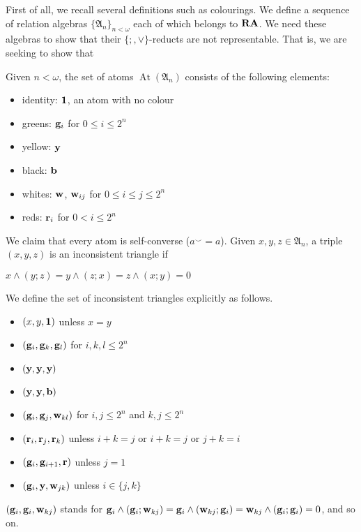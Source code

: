 \documentclass[a4paper]{article}
\theoremstyle{defin}
\theoremstyle{theorem}
\theoremstyle{prop}
\theoremstyle{lemma}
\theoremstyle{ex}
\theoremstyle{col}
\begin{document}
First of all, we recall several definitions such as colourings. We define a sequence of relation algebras $\{ \mathfrak{A}_n \}_{n < \omega}$ each of which belongs to ${\bf RA}$. We need these algebras to show that their $\{;, \vee\}$-reducts are not representable. That is, we are seeking to show that

Given $n < \omega$, the set of atoms $\operatorname{At}(\mathfrak{A}_n)$ consists of the following elements:
\begin{itemize}
\item identity: ${\bf 1}$, an atom with no colour
\item greens: ${\bf g}_i$ for $0 \leq i \leq 2^n$
\item yellow: ${\bf y}$
\item black: ${\bf b}$
\item whites: ${\bf w}$, ${\bf w}_{ij}$ for $0 \leq i \leq j \leq 2^n$
\item reds: ${\bf r}_i$ for $0 < i \leq 2^n$
\end{itemize}
We claim that every atom is self-converse ($a^{\smile} = a$). Given $x, y, z \in \mathfrak{A}_n$, a triple $(x,y,z)$ is an  inconsistent triangle if
\begin{center}
$x \land (y ; z) = y \land (z ; x) = z \land (x ; y) = 0$
\end{center}
We define the set of inconsistent triangles explicitly as follows.
\begin{itemize}
  \item $(x, y, {\bf 1})$ unless $x = y$
  \item $({\bf g}_i, {\bf g}_k, {\bf g}_l)$ for $i, k, l \leq 2^n$
  \item $({\bf y}, {\bf y}, {\bf y})$
  \item $({\bf y}, {\bf y}, {\bf b})$
  \item $({\bf g}_i, {\bf g}_j, {\bf w}_{kl})$ for $i, j \leq 2^n$ and $k, j \leq 2^n$
  \item $({\bf r}_i, {\bf r}_j, {\bf r}_k)$ unless $i + k = j$ or $i + k = j$ or $j + k = i$
  \item $({\bf g}_i, {\bf g}_{i + 1}, {\bf r})$ unless $j = 1$
  \item $({\bf g}_i, {\bf y}, {\bf w}_{jk})$ unless $i \in \{ j, k \}$
\end{itemize}
$({\bf g}_i, {\bf g}_i, {\bf w}_{kj})$ stands for ${\bf g}_i \land ({\bf g}_i ; {\bf w}_{kj}) = {\bf g}_i \land ({\bf w}_{kj} ; {\bf g}_i) = {\bf w}_{kj} \land ({\bf g}_i ; {\bf g}_i) = 0$, and so on.
\end{document}
